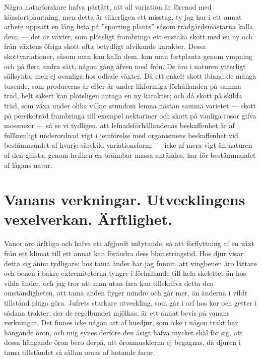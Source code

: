 Några naturforskare hafva påstått, att all variation är förenad med könsfortplantning, men detta är säkerligen ett misstag, ty jag har i ett annat arbete uppsatt en lång lista på ”sporting plants” såsom trädgårdsmästarna kalla dem; — det är växter, som plötsligt frambringa ett enstaka skott med en ny och från växtens öfriga skott ofta betydligt afvikande karakter. Dessa skottvariationer, såsom man kan kalla dem, kan man fortplanta genom ympning och på flera andra sätt, någon gång äfven med frön. De äro i naturen ytterligt sällsynta, men ej ovanliga hos odlade växter. Då ett enkelt skott ibland de många tusende, som produceras år efter år under likformiga förhållanden på samma träd, helt säkert kan plötsligen antaga en ny karakter; och då skott på skilda träd, som växa under olika vilkor stundom lemna nästan samma varietet — skott på persikoträd frambringa till exempel nektariner och skott på vanliga rosor gifva mossrosor — så se vi tydligen, att lefnadsförhållandenas beskaffenhet är af fullkomligt underordnad vigt i jemförelse med organismens beskaffenhet vid bestämmandet af hvarje särskild variationsform; — icke af mera vigt än naturen af den gnista, genom hvilken en brännbar massa antändes, har för bestämmandet af lågans natur.



\section[Vanans verkningar]{Vanans verkningar. Utvecklingens vexelverkan. 
Ärftlighet.}

Vanor äro ärftliga och hafva ett afgjordt inflytande, så att förflyttning af en växt från ett klimat till ett annat kan förändra dess blomstringstid. Hos djur visar detta sig ännu tydligare; hos tama änder har jag funnit, att vingbenen äro lättare och benen i bakre extremiteterna tyngre i förhållande till hela skelettet än hos vilda änder, och jag tror att man utan fara kan tillskrifva detta den omständigheten, att tama anden flyger mindre och går mer, än änderna i vildt tillstånd pläga göra. Jufrets starkare utveckling, som går i arf hos kor och getter i sådana trakter, der de regelbundet mjölkas, är ett annat bevis på vanans verkningar. Det finnes icke någon art af husdjur, som icke i någon trakt har hängande öron, och mig synes derföre den åsigt hafva mycket skäl för sig, att dessa hängande öron bero derpå, att öronmusklerna ej begagnas, då djuren i tama tillståndet så sällan oroas af hotande faror.

